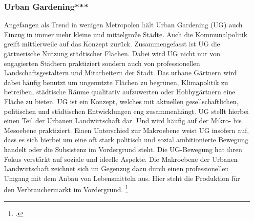 \documentclass{scrartcl}
\begin{document}
\subsubsection{Urban Gardening***}

Angefangen als Trend in wenigen Metropolen hält Urban Gardening (UG) auch Einzug in immer mehr kleine und mittelgroße Städte. Auch die Kommunalpolitik greift mittlerweile auf das Konzept zurück. Zusammengefasst ist UG die gärtnerische Nutzung städtischer Flächen. Dabei wird UG nicht nur von engagierten Städtern praktiziert sondern auch von professionellen Landschaftsgestaltern und Mitarbeitern der Stadt. Das urbane Gärtnern wird dabei häufig benutzt um ungenutzte Flächen zu begrünen, Klimapolitik zu betreiben, städtische Räume qualitativ aufzuwerten oder Hobbygärtnern eine Fläche zu bieten. UG ist ein Konzept, welches mit aktuellen gesellschaftlichen, politischen und städtischen Entwicklungen eng zusammenhängt.
UG stellt hierbei einen Teil der Urbanen Landwirtschaft dar. Und wird häufig auf der Mikro- bis Mesoebene praktiziert. Einen Unterschied zur Makroebene weist UG insofern auf, dass es sich hierbei um eine oft stark politisch und sozial ambitionierte Bewegung handelt oder die Subsistenz im Vordergrund steht. Die UG-Bewegung hat ihren Fokus verstärkt auf soziale und ideelle Aspekte. Die Makroebene der Urbanen Landwirtschaft zeichnet sich im Gegenzug dazu durch einen professionellen Umgang mit dem Anbau von Lebensmitteln aus. Hier steht die Produktion für den Verbrauchermarkt im Vordergrund. \footcite[S.27]{}
\end{document}
